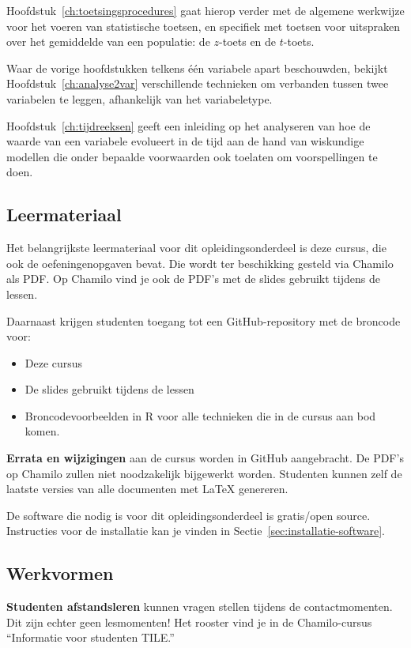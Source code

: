 Hoofdstuk~\ref{ch:toetsingsprocedures} gaat hierop verder met de algemene werkwijze voor het voeren van statistische toetsen, en specifiek met toetsen voor uitspraken over het gemiddelde van een populatie: de $z$-toets en de $t$-toets.

Waar de vorige hoofdstukken telkens één variabele apart beschouwden, bekijkt Hoofdstuk~\ref{ch:analyse2var} verschillende technieken om verbanden tussen twee variabelen te leggen, afhankelijk van het variabeletype.

Hoofdstuk~\ref{ch:tijdreeksen} geeft een inleiding op het analyseren van hoe de waarde van een variabele evolueert in de tijd aan de hand van wiskundige modellen die onder bepaalde voorwaarden ook toelaten om voorspellingen te doen.

\subsection{Leermateriaal}

Het belangrijkste leermateriaal voor dit opleidingsonderdeel is deze cursus, die ook de oefeningenopgaven bevat. Die wordt ter beschikking gesteld via Chamilo als PDF. Op Chamilo vind je ook de PDF's met de slides gebruikt tijdens de lessen.

Daarnaast krijgen studenten toegang tot een GitHub-repository met de broncode voor:

\begin{itemize}
  \item Deze cursus
  \item De slides gebruikt tijdens de lessen
  \item Broncodevoorbeelden in R voor alle technieken die in de cursus aan bod komen.
\end{itemize}

\textbf{Errata en wijzigingen} aan de cursus worden in GitHub aangebracht. De PDF's op Chamilo zullen niet noodzakelijk bijgewerkt worden. Studenten kunnen zelf de laatste versies van alle documenten met \LaTeX{} genereren.

De software die nodig is voor dit opleidingsonderdeel is gratis/open source. Instructies voor de installatie kan je vinden in Sectie~\ref{sec:installatie-software}.

\subsection{Werkvormen}

\textbf{Studenten afstandsleren} kunnen vragen stellen tijdens de contactmomenten. Dit zijn echter geen lesmomenten! Het rooster vind je in de Chamilo-cursus ``Informatie voor studenten TILE.''


